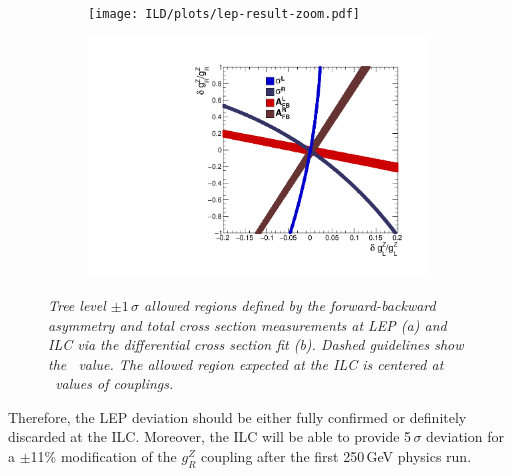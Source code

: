 \begin{figure}
	\centering
	\begin{subfigure}{0.5\textwidth}
		\texttt{[image: ILD/plots/lep-result-zoom.pdf]}
		\caption{\label{fig:LEPILCResult_a_3} }
	\end{subfigure}%
	\begin{subfigure}{0.5\textwidth}
		\centering
		\includegraphics[width=0.99\textwidth]{ILD/plots/ilc-result.pdf}
		\caption{\label{fig:LEPILCResult_b_3} }
	\end{subfigure}
	\caption{\sl Tree level $\pm 1\,\sigma$ allowed regions defined by the forward-backward asymmetry and total cross section measurements at LEP (a) and ILC via the differential cross section fit (b). Dashed guidelines show the \sm\ value. The allowed region expected at the ILC is centered at \sm\ values of couplings.}
	\label{fig:LEPILCResult_3}
\end{figure}
Therefore, the LEP deviation should be either fully confirmed or definitely discarded at the ILC. 
Moreover, the ILC will be able to provide 5\,$\sigma$ deviation for a $\pm$11\% modification of the $g_R^Z$ coupling after the first 250\,GeV physics run.

